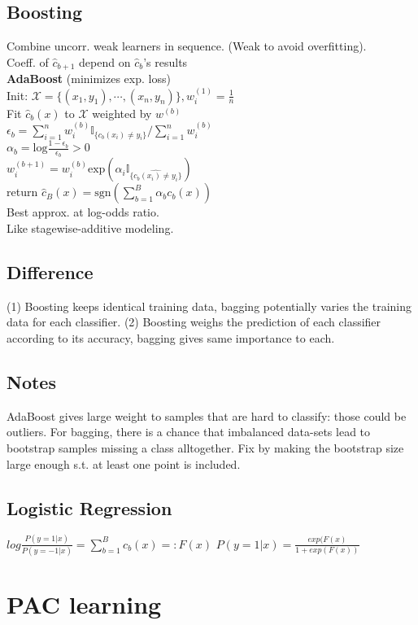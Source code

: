 \subsection*{Boosting}
Combine uncorr. weak learners in sequence. (Weak to avoid overfitting).\\
Coeff. of $\hat{c}_{b+1}$ depend on $\hat{c}_{b}$'s results\\
\textbf{AdaBoost} (minimizes exp. loss)\\
Init: $\mathcal{X}{=}\{(x_1,y_1),\cdots,(x_n,y_n)\}, w_i^{(1)}{=}\frac{1}{n}$\\
Fit  $\hat{c}_b(x)$ to $\mathcal{X}$ weighted by $w^{(b)}$\\
$\epsilon_b=\sum_{i=1}^nw_i^{(b)}\mathbb{I}_{\{c_b(x_i)\not=y_i\}}/\sum_{i=1}^nw_i^{(b)}$\\
$\alpha_b = \mathrm{log}\frac{1-\epsilon_b}{\epsilon_b}>0$\\
$w_i^{(b+1)}=w_i^{(b)}\mathrm{exp}(\alpha_i\mathbb{I}_{\{\hat{c_b(x_i)\not=y_i}\}})$\\
return $\hat{c}_B(x){=}\mathrm{sgn}(\sum_{b{=}1}^B\alpha_bc_b(x))$\\
Best approx. at log-odds ratio. \\
Like stagewise-additive modeling.

\subsection*{Difference}
(1) Boosting keeps identical training data, bagging potentially varies the training data for each classifier. (2) Boosting weighs the prediction of each classifier according to its accuracy, bagging gives same importance to each.
\subsection*{Notes}
AdaBoost gives large weight to samples that are hard to classify: those could be outliers. For bagging, there is a chance that imbalanced data-sets lead to bootstrap samples missing a class alltogether. Fix by making the bootstrap size large enough s.t. at least one point is included.
\subsection*{Logistic Regression}
$log\frac{P(y=1|x)}{P(y=-1|x)} = \sum_{b=1}^Bc_b(x) =: F(x)$
$P(y=1|x) = \frac{exp(F(x)}{1+exp(F(x))}$

\section*{PAC learning}
